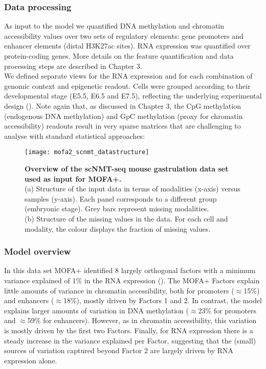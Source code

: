 \subsubsection{Data processing}

As input to the model we quantified DNA methylation and chromatin accessibility values over two sets of regulatory elements: gene promoters and enhancer elements (distal H3K27ac sites). RNA expression was quantified over protein-coding genes. More details on the feature quantification and data processing steps are described in Chapter 3.\\
We defined separate views for the RNA expression and for each combination of genomic context and epigenetic readout. Cells were grouped according to their developmental stage (E5.5, E6.5 and E7.5), reflecting the underlying experimental design\cite{Argelaguet2019} (). Note again that, as discussed in Chapter 3, the CpG methylation (endogenous DNA methylation) and GpC methylation (proxy for chromatin accessibility) readouts result in very sparse matrices that are challenging to analyse with standard statistical approaches:

\begin{figure}[H]
	\centering
	\texttt{[image: mofa2\_scnmt\_datastructure]}
	\caption[]{
	\textbf{Overview of the scNMT-seq mouse gastrulation data set used as input for MOFA+.}\\
	(a) Structure of the input data in terms of modalities (x-axis) versus samples (y-axis). Each panel corresponds to a different group (embryonic stage). Grey bars represent missing modalities. \\
	(b) Structure of the missing values in the data. For each cell and modality, the colour displays the fraction of missing values.
	}
	\label{fig:mofa2_scnmt_datastructure}
\end{figure}

\subsubsection{Model overview}

In this data set MOFA+ identified 8 largely orthogonal factors with a minimum variance explained of 1\% in the RNA expression (). The MOFA+ Factors explain little amounts of variance in chromatin accessibility, both for promoters ($\approx$15\%) and enhancers ($\approx$18\%), mostly driven by Factors 1 and 2. In contrast, the model explains larger amounts of variation in DNA methylation ($\approx$23\% for promoters and $\approx$59\% for enhancers). However, as in chromatin accessibility, this variation is mostly driven by the first two Factors. Finally, for RNA expression there is a steady increase in the variance explained per Factor, suggesting that the (small) sources of variation captured beyond Factor 2 are largely driven by RNA expression alone.

